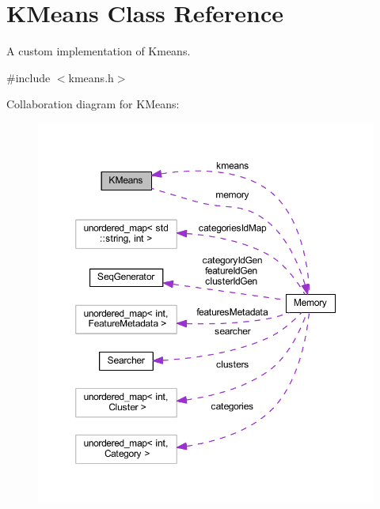 \hypertarget{class_k_means}{}\section{K\+Means Class Reference}
\label{class_k_means}


A custom implementation of Kmeans.  




{\ttfamily \#include $<$kmeans.\+h$>$}



Collaboration diagram for K\+Means\+:
\nopagebreak
\begin{figure}[H]
\begin{center}
\leavevmode
\includegraphics[width=350pt]{class_k_means__coll__graph}
\end{center}
\end{figure}
